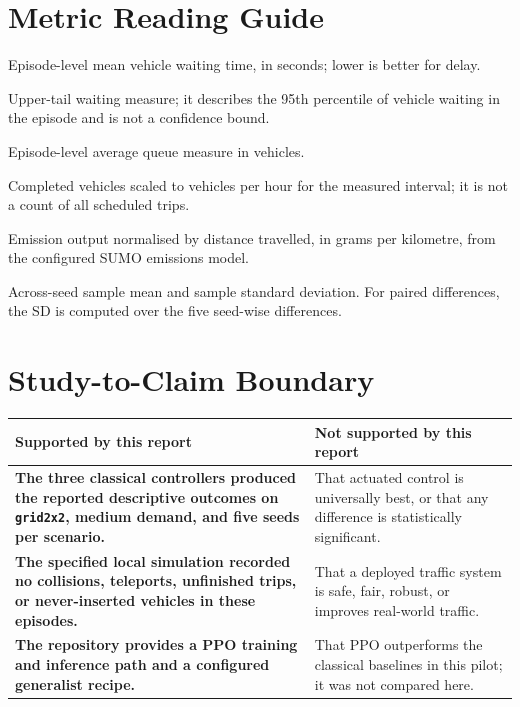 \documentclass[11pt,a4paper]{article}
\begin{document}
\section{Metric Reading Guide}
\begin{description}[leftmargin=4.2cm,style=nextline]
  \item[Mean waiting time] Episode-level mean vehicle waiting time, in seconds; lower
  is better for delay.
  \item[95th-percentile waiting] Upper-tail waiting measure; it describes the 95th
  percentile of vehicle waiting in the episode and is not a confidence bound.
  \item[Mean queue] Episode-level average queue measure in vehicles.
  \item[Throughput] Completed vehicles scaled to vehicles per hour for the measured
  interval; it is not a count of all scheduled trips.
  \item[CO$_2$ intensity] Emission output normalised by distance travelled, in grams
  per kilometre, from the configured SUMO emissions model.
  \item[Mean $\pm$ SD] Across-seed sample mean and sample standard deviation. For
  paired differences, the SD is computed over the five seed-wise differences.
\end{description}

\section{Study-to-Claim Boundary}
\begin{center}
\begin{tabularx}{0.96\textwidth}{>{\bfseries}p{4.0cm}X}
\toprule
Supported by this report & Not supported by this report \\
\midrule
The three classical controllers produced the reported descriptive outcomes on
\texttt{grid2x2}, medium demand, and five seeds per scenario. &
That actuated control is universally best, or that any difference is statistically
significant. \\
The specified local simulation recorded no collisions, teleports, unfinished trips,
or never-inserted vehicles in these episodes. &
That a deployed traffic system is safe, fair, robust, or improves real-world traffic. \\
The repository provides a PPO training and inference path and a configured generalist
recipe. &
That PPO outperforms the classical baselines in this pilot; it was not compared here. \\
\bottomrule
\end{tabularx}
\end{center}
\end{document}
